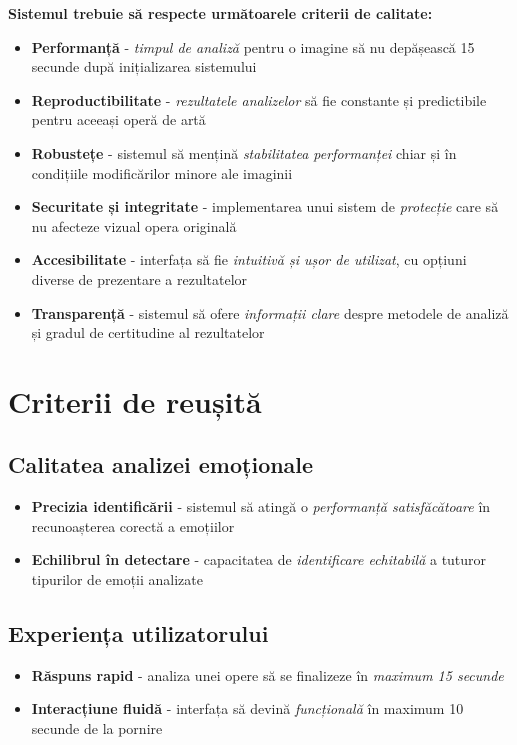 \textbf{Sistemul trebuie să respecte următoarele criterii de calitate:}

\begin{itemize}
  \item \textbf{Performanță} - \emph{timpul de analiză} pentru o imagine să nu depășească 15 secunde după inițializarea sistemului
  \item \textbf{Reproductibilitate} - \textit{rezultatele analizelor} să fie constante și predictibile pentru aceeași operă de artă
  \item \textbf{Robustețe} - sistemul să mențină \emph{stabilitatea performanței} chiar și în condițiile modificărilor minore ale imaginii
  \item \textbf{Securitate și integritate} - implementarea unui sistem de \textit{protecție} care să nu afecteze vizual opera originală
  \item \textbf{Accesibilitate} - interfața să fie \emph{intuitivă și ușor de utilizat}, cu opțiuni diverse de prezentare a rezultatelor
  \item \textbf{Transparență} - sistemul să ofere \textit{informații clare} despre metodele de analiză și gradul de certitudine al rezultatelor
\end{itemize}

\section{Criterii de reușită}
\label{sec:criterii-reusita}

\subsection{Calitatea analizei emoționale}
\begin{itemize}
  \item \textbf{Precizia identificării} - sistemul să atingă o \emph{performanță satisfăcătoare} în recunoașterea corectă a emoțiilor
  \item \textbf{Echilibrul în detectare} - capacitatea de \textit{identificare echitabilă} a tuturor tipurilor de emoții analizate
\end{itemize}

\subsection{Experiența utilizatorului}
\begin{itemize}
  \item \textbf{Răspuns rapid} - analiza unei opere să se finalizeze în \emph{maximum 15 secunde}
  \item \textbf{Interacțiune fluidă} - interfața să devină \textit{funcțională} în maximum 10 secunde de la pornire
\end{itemize}

